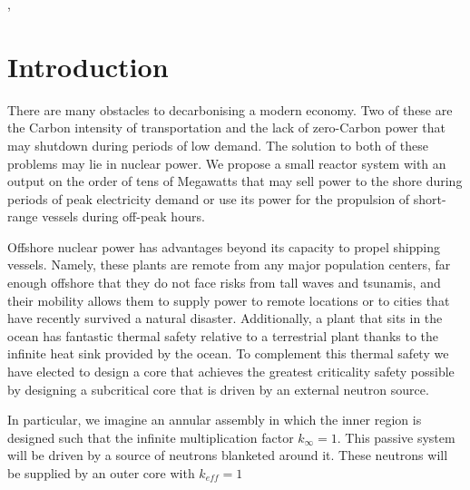 \documentclass[12pt]{article}
\begin{document}
\pagebreak
\tableofcontents, 


\section{Introduction}
There are many obstacles to decarbonising a modern economy. Two of these are the Carbon intensity of transportation and the lack of zero-Carbon power that may shutdown during periods of low demand. The solution to both of these problems may lie in nuclear power. We propose a small reactor system with an output on the order of tens of Megawatts that may sell power to the shore during periods of peak electricity demand or use its power for the propulsion of short-range vessels during off-peak hours. 

Offshore nuclear power has advantages beyond its capacity to propel shipping vessels. Namely, these plants are remote from any major population centers, far enough offshore that they do not face risks from tall waves and tsunamis, and their mobility allows them to supply power to remote locations or to cities that have recently survived a natural disaster. Additionally, a plant that sits in the ocean has fantastic thermal safety relative to a terrestrial plant thanks to the infinite heat sink provided by the ocean. To complement this thermal safety we have elected to design a core that achieves the greatest criticality safety possible by designing a subcritical core that is driven by an external neutron source. 

In particular, we imagine an annular assembly in which the inner region is designed such that the infinite multiplication factor $k_\infty = 1$. This passive system will be driven by a source of neutrons blanketed around it. These neutrons will be supplied by an outer core with $k_{eff} = 1 $ 







\end{document}
